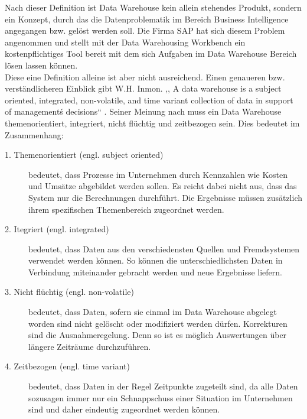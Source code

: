 Nach dieser Definition ist Data Warehouse kein allein stehendes Produkt, sondern ein Konzept, durch das die Datenproblematik im Bereich Business Intelligence  angegangen bzw. gelöst werden soll. Die Firma SAP hat sich diesem Problem angenommen und stellt mit der Data Warehousing Workbench ein kostenpflichtiges Tool bereit mit dem sich Aufgaben im Data Warehouse Bereich lösen lassen können.  \\
Diese eine Definition alleine ist aber nicht ausreichend. Einen genaueren bzw. verständlicheren Einblick gibt W.H. Inmon. ,, A data warehouse is a subject oriented, integrated, non-volatile, and time variant collection of data in support of management\'s decisions`` \cite[S. 33]{Inmon:2005vg}. Seiner Meinung nach muss ein Data Warehouse themenorientiert, integriert, nicht flüchtig und zeitbezogen sein. Dies bedeutet im Zusammenhang: \\
\begin{description}
	\item [1. Themenorientiert (engl. subject oriented)] bedeutet, dass Prozesse im Unternehmen durch Kennzahlen wie Kosten und Umsätze abgebildet werden sollen. Es reicht dabei nicht aus, dass das System nur die Berechnungen durchführt. Die Ergebnisse müssen zusätzlich ihrem spezifischen Themenbereich zugeordnet werden. 
	\item [2. Itegriert (engl. integrated)] bedeutet, dass Daten aus den verschiedensten Quellen und Fremdsystemen verwendet werden können. So können die unterschiedlichsten Daten in Verbindung miteinander gebracht werden und neue Ergebnisse liefern.
	\item [3. Nicht flüchtig (engl. non-volatile)]bedeutet, dass Daten, sofern sie einmal im Data Warehouse abgelegt worden sind nicht gelöscht oder modifiziert werden dürfen. Korrekturen sind die Ausnahmeregelung. Denn so ist es möglich Auswertungen über längere Zeiträume durchzuführen.
	\item [4. Zeitbezogen (engl. time variant)] bedeutet, dass Daten in der Regel Zeitpunkte zugeteilt sind, da alle Daten sozusagen immer nur ein Schnappschuss einer Situation im Unternehmen sind und daher eindeutig zugeordnet werden können.
\end{description}




